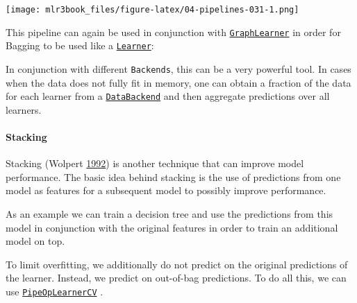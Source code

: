 \documentclass[]{article}
\newenvironment{Shaded}{}{}
\newcommand{\KeywordTok}[1]{\textcolor[rgb]{0.00,0.00,1.00}{#1}}
\newcommand{\NormalTok}[1]{#1}
\newcommand{\OperatorTok}[1]{#1}
\newcommand{\StringTok}[1]{\textcolor[rgb]{0.00,0.50,0.50}{#1}}
\let\oldparagraph\paragraph
\renewcommand{\paragraph}[1]{\oldparagraph{#1}\mbox{}}
\renewenvironment{Shaded} {\begin{snugshade}\small} {\end{snugshade}}
\begin{document}
\texttt{[image: mlr3book\_files/figure-latex/04-pipelines-031-1.png]}

This pipeline can again be used in conjunction with \href{https://mlr3pipelines.mlr-org.com/reference/mlr_learners_graph.html}{\texttt{GraphLearner}} in order for Bagging to be used like a \href{https://mlr3.mlr-org.com/reference/Learner.html}{\texttt{Learner}}:

\begin{Shaded}
\end{Shaded}

In conjunction with different \texttt{Backends}, this can be a very powerful tool.
In cases when the data does not fully fit in memory, one can obtain a fraction of the data for each learner from a \href{https://mlr3.mlr-org.com/reference/DataBackend.html}{\texttt{DataBackend}} and then aggregate predictions over all learners.

\hypertarget{pipe-model-ensembles-stacking}{%
\paragraph{Stacking}\label{pipe-model-ensembles-stacking}}

Stacking (Wolpert \protect\hyperlink{ref-Wolpert1992}{1992}) is another technique that can improve model performance.
The basic idea behind stacking is the use of predictions from one model as features for a subsequent model to possibly improve performance.

As an example we can train a decision tree and use the predictions from this model in conjunction with the original features in order to train an additional model on top.

To limit overfitting, we additionally do not predict on the original predictions of the learner.
Instead, we predict on out-of-bag predictions.
To do all this, we can use \href{https://mlr3pipelines.mlr-org.com/reference/mlr_pipeops_learner_cv.html}{\texttt{PipeOpLearnerCV}} .
\end{document}
